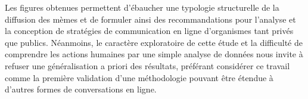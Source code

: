 Les figures obtenues permettent d’ébaucher une typologie structurelle de la diffusion des mèmes et de formuler ainsi des recommandations pour l’analyse et la conception de stratégies de communication en ligne d’organismes tant privés que publics. Néanmoins, le caractère exploratoire de cette étude et la difficulté de comprendre les actions humaines par une simple analyse de données nous invite à refuser une généralisation a priori des résultats, préférant considérer ce travail comme la première validation d’une méthodologie pouvant être étendue à d’autres formes de conversations en ligne.

